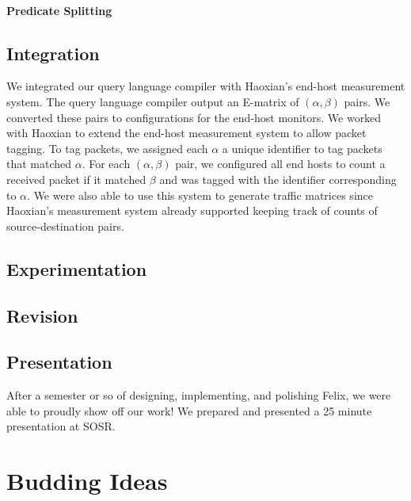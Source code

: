 \paragraph{Predicate Splitting}

\subsection{Integration}
We integrated our query language compiler with Haoxian's end-host measurement
system. The query language compiler output an E-matrix of $(\alpha, \beta)$
pairs. We converted these pairs to configurations for the end-host monitors. We
worked with Haoxian to extend the end-host measurement system to allow packet
tagging. To tag packets, we assigned each $\alpha$ a unique identifier to tag
packets that matched $\alpha$. For each $(\alpha, \beta)$ pair, we configured
all end hosts to count a received packet if it matched $\beta$ and was tagged
with the identifier corresponding to $\alpha$.  We were also able to use this
system to generate traffic matrices since Haoxian's measurement system already
supported keeping track of counts of source-destination pairs.

\subsection{Experimentation}

\subsection{Revision}

\subsection{Presentation}
After a semester or so of designing, implementing, and polishing Felix, we were
able to proudly show off our work! We prepared and presented a 25 minute
presentation at SOSR.

\section{Budding Ideas}


